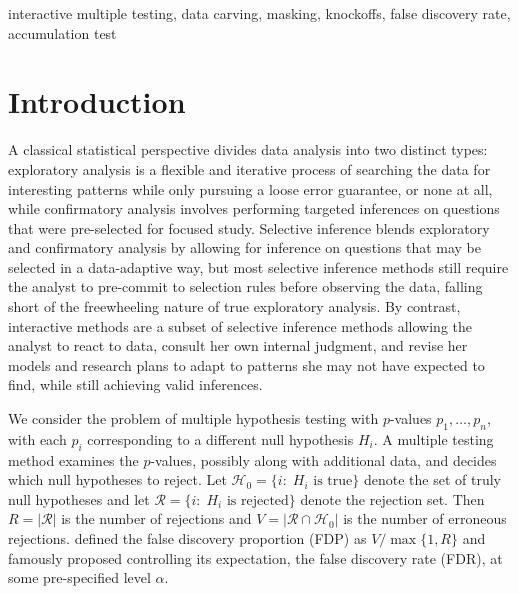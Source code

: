 \documentclass{biometrika}
\newcommand{\cH}{\mathcal{H}}
\newcommand{\cR}{\mathcal{R}}
\newcommand{\textFDP}{FDP}
\newcommand{\textFDR}{FDR}
\newcommand{\1}{\mathbf{1}}
\begin{document}
\begin{keywords}
interactive multiple testing, data carving, masking, knockoffs, false discovery rate, accumulation test
\end{keywords}

\section{Introduction}

A classical statistical perspective divides data analysis into two distinct types: exploratory analysis is a flexible and iterative process of searching the data for interesting patterns while only pursuing a loose error guarantee, or none at all, while confirmatory analysis involves performing targeted inferences on questions that were pre-selected for focused study. Selective inference blends exploratory and confirmatory analysis by allowing for inference on questions that may be selected in a data-adaptive way, but most selective inference methods still require the analyst to pre-commit to selection rules before observing the data, falling short of the freewheeling nature of true exploratory analysis. By contrast, interactive methods are a subset of selective inference methods allowing the analyst to react to data, consult her own internal judgment, and revise her models and research plans to adapt to patterns she may not have expected to find, while still achieving valid inferences.

We consider the problem of multiple hypothesis testing with $p$-values $p_1,\ldots,p_n$, with each $p_i$ corresponding to a different null hypothesis $H_i$. A multiple testing method examines the $p$-values, possibly along with additional data, and decides which null hypotheses to reject. Let $\cH_0 = \{i:\; H_i \text{ is true}\}$ denote the set of truly null hypotheses and let $\cR = \{i:\; H_i \text{ is rejected}\}$ denote the rejection set. Then $R = \left|\cR\right|$ is the number of rejections and $V = \left|\cR \cap \cH_0 \right|$ is the number of erroneous rejections. \citet{bh95} defined the false discovery proportion (\textFDP) as $V/\max\{1,R\}$ and famously proposed controlling its expectation, the false discovery rate (\textFDR), at some pre-specified level $\alpha$.
\end{document}
